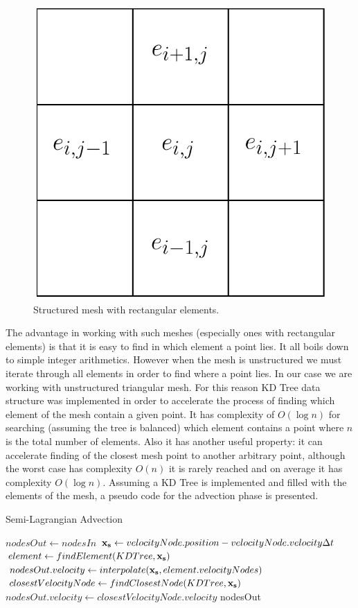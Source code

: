 \begin{figure}[H]
	\centering
	\includegraphics[width=0.4\linewidth]{Figures/structured-mesh.pdf}
	\caption{Structured mesh with rectangular elements.}\label{fig:structured-mesh}
\end{figure}

The advantage in working with such meshes (especially ones with rectangular elements) is that it is easy to find in which element a point lies. It all boils down to simple integer arithmetics. However when the mesh is unstructured we must iterate through all elements in order to find where a point lies. In our case we are working with unstructured triangular mesh. For this reason KD Tree data structure was implemented in order to accelerate the process of finding which element of the mesh contain a given point. It has complexity of $O(\log{n})$ for searching (assuming the tree is balanced) which element contains a point where $n$ is the total number of elements. Also it has another useful property: it can accelerate finding of the closest mesh point to another arbitrary point, although the worst case has complexity $O(n)$ it is rarely reached and on average it has complexity $O(\log{n})$. Assuming a KD Tree is implemented and filled with the elements of the mesh, a pseudo code for the advection phase is presented.

\begin{algorithm}[H]
\centering
\caption{Semi-Lagrangian Advection}\label{alg:Semi-Lagrangian-Advection}
\begin{algorithmic}[1]
			\State $nodesOut \gets nodesIn$
				\State $\mathbf{x_s} \gets velocityNode.position - velocityNode.velocity\Delta t $
					\State $element \gets findElement(KDTree, \mathbf{x_s})$
					\State $nodesOut.velocity \gets interpolate(\mathbf{x_s}, element.velocityNodes)$
				\Else
					\State $closestVelocityNode \gets findClosestNode(KDTree, \mathbf{x_s})$
					\State $nodesOut.velocity \gets closestVelocityNode.velocity$
				\EndIf
			\EndFor
		\EndProcedure
		\Return nodesOut
\end{algorithmic}
\end{algorithm}

